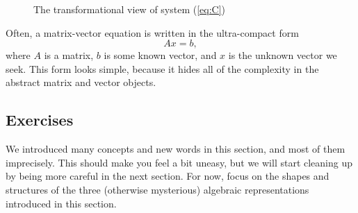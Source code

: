 \documentclass[elementsmain.tex]{subfiles}
\begin{document}
\begin{figure}[h!]
\centering
{}
\caption{The transformational view of system (\ref{eq:C})}
\label{fig:trans-pic-C}
\end{figure}



Often, a matrix-vector equation is written in the ultra-compact form
\[
Ax=b,
\] where $A$ is a matrix, $b$ is some known vector, and $x$ is the unknown vector we seek. This form looks simple, because it hides all of the complexity in the abstract matrix and vector objects.


\clearpage

\subsection*{Exercises}

We introduced many concepts and new words in this section, and most of them imprecisely. This should make you feel a bit uneasy, but we will start cleaning up by being more careful in the next section. For now, focus on the shapes and structures of the three (otherwise mysterious) algebraic representations introduced in this section.
\end{document}

